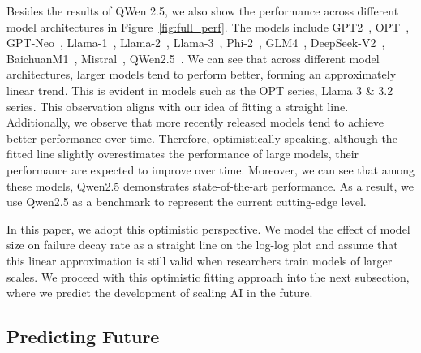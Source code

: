 Besides the results of QWen 2.5, we also show the performance across different model architectures in Figure~\ref{fig:full_perf}. The models include GPT2~\citep{radford2019language}, OPT~\citep{zhang2022opt}, GPT-Neo~\citep{gpt-neo}, Llama-1~\citep{touvron2023llama1}, Llama-2~\citep{touvron2023llama2}, Llama-3~\citep{dubey2024llama}, Phi-2~\citep{javaheripi2023phi}, GLM4~\citep{glm2024chatglm}, DeepSeek-V2~\citep{deepseekv2}, BaichuanM1~\citep{baichuan_m1}, Mistral~\citep{jiang2023mistral7b}, QWen2.5~\citep{qwen2.5}.
We can see that across different model architectures, larger models tend to perform better, forming an approximately linear trend. This is evident in models such as the OPT series, Llama 3 \& 3.2 series. This observation aligns with our idea of fitting a straight line. Additionally, we observe that more recently released models tend to achieve better performance over time. Therefore, optimistically speaking, although the fitted line slightly overestimates the performance of large models, their performance are expected to improve over time. Moreover, we can see that among these models, Qwen2.5 demonstrates state-of-the-art performance. As a result, we use Qwen2.5 as a benchmark to represent the current cutting-edge level.



In this paper, we adopt this optimistic perspective. We model the effect of model size on failure decay rate as a straight line on the log-log plot and assume that this linear approximation is still valid when researchers train models of larger scales. We proceed with this optimistic fitting approach into the next subsection, where we predict the development of scaling AI in the future.

\subsection{Predicting Future}





